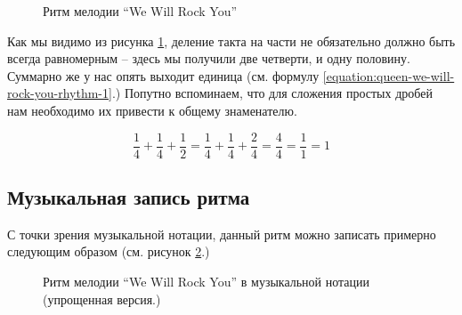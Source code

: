 \documentclass[a4paper,twoside]{book}
\begin{document}
\begin{figure}[ht]
  \label{fig:queen-we-will-rock-you-rhythm-1}
  \caption{Ритм мелодии ``We Will Rock You''}
\end{figure}

Как мы видимо из рисунка \ref{fig:queen-we-will-rock-you-rhythm-1}, деление
такта на части не обязательно должно быть всегда равномерным -- здесь мы получили
две четверти, и одну половину. Суммарно же у нас опять выходит единица (см.
формулу \ref{equation:queen-we-will-rock-you-rhythm-1}.) Попутно вспоминаем, что
для сложения простых дробей нам необходимо их привести к общему знаменателю.

\begin{equation}
  \label{equation:queen-we-will-rock-you-rhythm-1}
  \frac{1}{4} + \frac{1}{4} + \frac{1}{2} = \frac{1}{4} + \frac{1}{4} + \frac{2}{4} = \frac{4}{4} = \frac{1}{1} = 1
\end{equation}

\subsection{Музыкальная запись ритма}

С точки зрения музыкальной нотации, данный ритм можно записать примерно
следующим образом (см. рисунок \ref{fig:lilypond-queen-1}.)

\begin{figure}[ht]
  \caption{Ритм мелодии ``We Will Rock You'' в музыкальной нотации (упрощенная версия.)}
  \centering
  \label{fig:lilypond-queen-1}
\end{figure}
\end{document}
